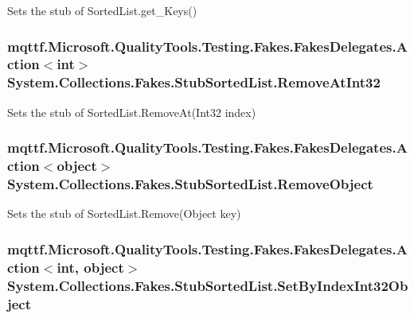 Sets the stub of Sorted\-List.\-get\-\_\-\-Keys()

\hypertarget{class_system_1_1_collections_1_1_fakes_1_1_stub_sorted_list_a505f88c0b4420324915cfdbc535c6154}{
\subsubsection[{Remove\-At\-Int32}]{\setlength{\rightskip}{0pt plus 5cm}mqttf.\-Microsoft.\-Quality\-Tools.\-Testing.\-Fakes.\-Fakes\-Delegates.\-Action$<$int$>$ System.\-Collections.\-Fakes.\-Stub\-Sorted\-List.\-Remove\-At\-Int32}}\label{class_system_1_1_collections_1_1_fakes_1_1_stub_sorted_list_a505f88c0b4420324915cfdbc535c6154}


Sets the stub of Sorted\-List.\-Remove\-At(\-Int32 index)

\hypertarget{class_system_1_1_collections_1_1_fakes_1_1_stub_sorted_list_abed22ddadd7ce9d92b4cdf698abe5b31}{
\subsubsection[{Remove\-Object}]{\setlength{\rightskip}{0pt plus 5cm}mqttf.\-Microsoft.\-Quality\-Tools.\-Testing.\-Fakes.\-Fakes\-Delegates.\-Action$<$object$>$ System.\-Collections.\-Fakes.\-Stub\-Sorted\-List.\-Remove\-Object}}\label{class_system_1_1_collections_1_1_fakes_1_1_stub_sorted_list_abed22ddadd7ce9d92b4cdf698abe5b31}


Sets the stub of Sorted\-List.\-Remove(\-Object key)

\hypertarget{class_system_1_1_collections_1_1_fakes_1_1_stub_sorted_list_ae63353de2d6de4455d9ef40bc449f3ac}{
\subsubsection[{Set\-By\-Index\-Int32\-Object}]{\setlength{\rightskip}{0pt plus 5cm}mqttf.\-Microsoft.\-Quality\-Tools.\-Testing.\-Fakes.\-Fakes\-Delegates.\-Action$<$int, object$>$ System.\-Collections.\-Fakes.\-Stub\-Sorted\-List.\-Set\-By\-Index\-Int32\-Object}}\label{class_system_1_1_collections_1_1_fakes_1_1_stub_sorted_list_ae63353de2d6de4455d9ef40bc449f3ac}


